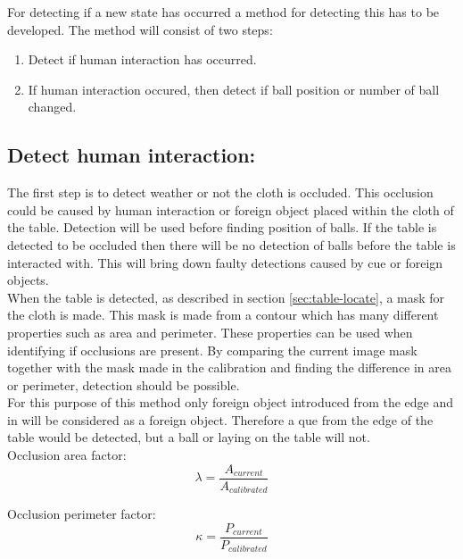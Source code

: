 For detecting if a new state has occurred a method for detecting this has to be developed. The method will consist of two steps:

\begin{enumerate}
	\item Detect if human interaction has occurred.
	\item If human interaction occured, then detect if ball position or number of ball changed.
\end{enumerate}


\subsection{Detect human interaction:}
The first step is to detect weather or not the cloth is occluded. This occlusion could be caused by human interaction or foreign object placed within the cloth of the table. Detection will be used before finding position of balls. If the table is detected to be occluded then there will be no detection of balls before the table is interacted with. This will bring down faulty detections caused by cue or foreign objects.\\

When the table is detected, as described in section \ref{sec:table-locate}, a mask for the cloth is made. This mask is made from a contour which has many different properties such as area and perimeter. These properties can be used when identifying if occlusions are present. By comparing the current image mask together with the mask made in the calibration and finding the difference in area or perimeter, detection should be possible.\\

For this purpose of this method only foreign object introduced from the edge and in will be considered as a foreign object. Therefore a que from the edge of the table would be detected, but a ball or laying on the table will not.\\

Occlusion area factor:
\begin{equation}
\lambda = \frac{A_{current}}{A_{calibrated}}
\label{eq:area}
\end{equation}

Occlusion perimeter factor:
\begin{equation}
\kappa = \frac{P_{current}}{P_{calibrated}}
\label{eq:perimeter}
\end{equation}

